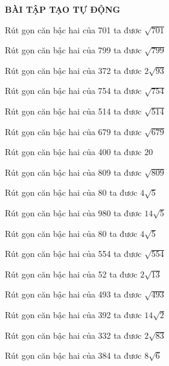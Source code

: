 \documentclass[12pt,a4paper]{article}
\begin{document}
\begin{center}
{\bf\Large BÀI TẬP TẠO TỰ ĐỘNG}
\end{center}
\begin{ex}
Rút gọn căn bậc hai của 701 ta đươc $\sqrt{701}$
\end{ex}
\begin{ex}
Rút gọn căn bậc hai của 799 ta đươc $\sqrt{799}$
\end{ex}
\begin{ex}
Rút gọn căn bậc hai của 372 ta đươc $2\sqrt{93}$
\end{ex}
\begin{ex}
Rút gọn căn bậc hai của 754 ta đươc $\sqrt{754}$
\end{ex}
\begin{ex}
Rút gọn căn bậc hai của 514 ta đươc $\sqrt{514}$
\end{ex}
\begin{ex}
Rút gọn căn bậc hai của 679 ta đươc $\sqrt{679}$
\end{ex}
\begin{ex}
Rút gọn căn bậc hai của 400 ta đươc $20$
\end{ex}
\begin{ex}
Rút gọn căn bậc hai của 809 ta đươc $\sqrt{809}$
\end{ex}
\begin{ex}
Rút gọn căn bậc hai của 80 ta đươc $4\sqrt{5}$
\end{ex}
\begin{ex}
Rút gọn căn bậc hai của 980 ta đươc $14\sqrt{5}$
\end{ex}
\begin{ex}
Rút gọn căn bậc hai của 80 ta đươc $4\sqrt{5}$
\end{ex}
\begin{ex}
Rút gọn căn bậc hai của 554 ta đươc $\sqrt{554}$
\end{ex}
\begin{ex}
Rút gọn căn bậc hai của 52 ta đươc $2\sqrt{13}$
\end{ex}
\begin{ex}
Rút gọn căn bậc hai của 493 ta đươc $\sqrt{493}$
\end{ex}
\begin{ex}
Rút gọn căn bậc hai của 392 ta đươc $14\sqrt{2}$
\end{ex}
\begin{ex}
Rút gọn căn bậc hai của 332 ta đươc $2\sqrt{83}$
\end{ex}
\begin{ex}
Rút gọn căn bậc hai của 384 ta đươc $8\sqrt{6}$
\end{ex}
\end{document}

